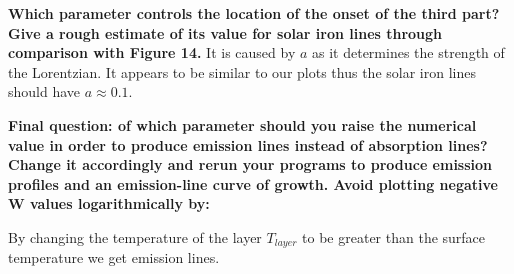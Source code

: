 \documentclass{article}
\begin{document}
\textbf{Which parameter controls the location of the onset of the third
part? Give a rough estimate of its value for solar iron lines through
comparison with Figure 14.} It is caused by \(a\) as it determines the
strength of the Lorentzian. It appears to be similar to our plots thus
the solar iron lines should have \(a \approx 0.1\).

\textbf{Final question: of which parameter should you raise the
numerical value in order to produce emission lines instead of absorption
lines? Change it accordingly and rerun your programs to produce emission
profiles and an emission-line curve of growth. Avoid plotting negative W
values logarithmically by:}

By changing the temperature of the layer \(T_{layer}\) to be greater
than the surface temperature we get emission lines.
\end{document}
